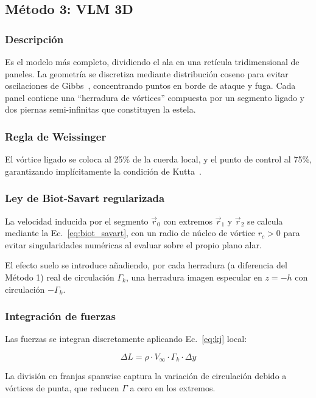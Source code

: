 \documentclass[twocolumn]{article}
\begin{document}
\subsection{Método 3: VLM 3D}

\subsubsection{Descripción}
Es el modelo más completo, dividiendo el ala en una retícula tridimensional de paneles. La geometría se discretiza mediante distribución coseno para evitar oscilaciones de Gibbs~\cite{katz2001}, concentrando puntos en borde de ataque y fuga. Cada panel contiene una ``herradura de vórtices'' compuesta por un segmento ligado y dos piernas semi-infinitas que constituyen la estela.

\subsubsection{Regla de Weissinger}
El vórtice ligado se coloca al 25\% de la cuerda local, y el punto de control al 75\%, garantizando implícitamente la condición de Kutta~\cite{weissinger1947}.

\subsubsection{Ley de Biot-Savart regularizada}

La velocidad inducida por el segmento $\vec{r}_0$ con extremos
$\vec{r}_1$ y $\vec{r}_2$ se calcula mediante la
Ec.~\eqref{eq:biot_savart}, con un radio de núcleo de vórtice
$r_c > 0$ para evitar singularidades numéricas al evaluar sobre el
propio plano alar. 

El efecto suelo se introduce añadiendo, por cada herradura (a diferencia del Método 1) real de
circulación $\Gamma_k$, una herradura imagen especular en $z = -h$
con circulación $-\Gamma_k$.

\subsubsection{Integración de fuerzas}
Las fuerzas se integran discretamente aplicando Ec.~\eqref{eq:kj} local:

\begin{equation}
\Delta L = \rho \cdot V_{\infty} \cdot \Gamma_k \cdot \Delta y
\end{equation}

La división en franjas spanwise captura la variación de circulación debido a vórtices de punta, que reducen $\Gamma$ a cero en los extremos.
\end{document}
